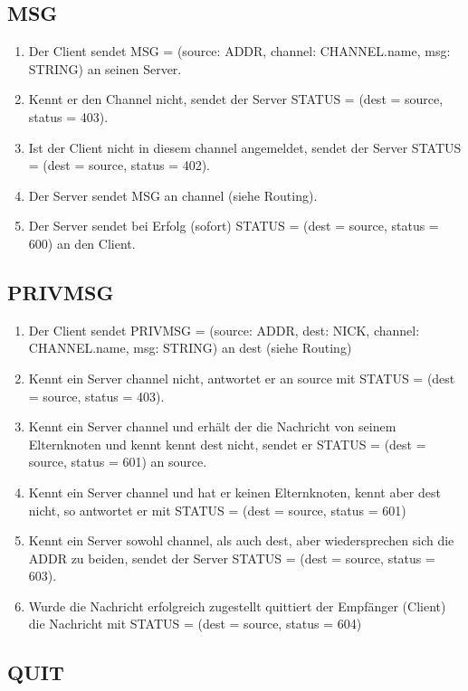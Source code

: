 \documentclass{article}
\begin{document}
\subsection{MSG}

\begin{enumerate}
  \item Der Client sendet MSG = (source: ADDR, channel: CHANNEL.name, msg: STRING) an seinen Server.
  \item Kennt er den Channel nicht, sendet der Server STATUS = (dest = source, status = 403).
  \item Ist der Client nicht in diesem channel angemeldet, sendet der Server STATUS = (dest = source, status = 402).
  \item Der Server sendet MSG an channel (siehe Routing).
  \item Der Server sendet bei Erfolg (sofort) STATUS = (dest = source, status = 600) an den Client.
\end{enumerate}

\subsection{PRIVMSG}

\begin{enumerate}
  \item Der Client sendet PRIVMSG = (source: ADDR, dest: NICK, channel: CHANNEL.name, msg: STRING) an dest (siehe Routing)
  \item Kennt ein Server channel nicht, antwortet er an source mit STATUS = (dest = source, status = 403).
  \item Kennt ein Server channel und erhält der die Nachricht von seinem Elternknoten und kennt kennt dest nicht, sendet er STATUS = (dest = source, status = 601) an source.
  \item Kennt ein Server channel und hat er keinen Elternknoten, kennt aber dest nicht, so antwortet er mit STATUS = (dest = source, status = 601)
  \item Kennt ein Server sowohl channel, als auch dest, aber wiedersprechen sich die ADDR zu beiden, sendet der Server STATUS = (dest = source, status = 603).
  \item Wurde die Nachricht erfolgreich zugestellt quittiert der Empfänger (Client) die Nachricht mit STATUS = (dest = source, status = 604)
\end{enumerate}

\subsection{QUIT}
\end{document}

